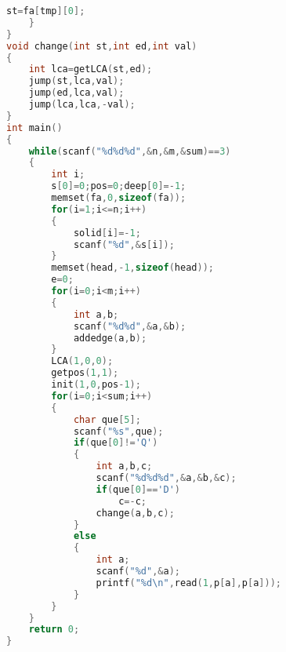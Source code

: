 \begin{lstlisting}[language=c++]
		st=fa[tmp][0];
	}
}
void change(int st,int ed,int val)
{
	int lca=getLCA(st,ed);
	jump(st,lca,val);
	jump(ed,lca,val);
	jump(lca,lca,-val);
}
int main()
{
	while(scanf("%d%d%d",&n,&m,&sum)==3)
	{
		int i;
		s[0]=0;pos=0;deep[0]=-1;
		memset(fa,0,sizeof(fa));
		for(i=1;i<=n;i++)
		{
			solid[i]=-1;
			scanf("%d",&s[i]);
		}
		memset(head,-1,sizeof(head));
		e=0;
		for(i=0;i<m;i++)
		{
			int a,b;
			scanf("%d%d",&a,&b);
			addedge(a,b);
		}
		LCA(1,0,0);
		getpos(1,1);
		init(1,0,pos-1);
		for(i=0;i<sum;i++)
		{
			char que[5];
			scanf("%s",que);
			if(que[0]!='Q')
			{
				int a,b,c;
				scanf("%d%d%d",&a,&b,&c);
				if(que[0]=='D')
					c=-c;
				change(a,b,c);
			}
			else
			{
				int a;
				scanf("%d",&a);
				printf("%d\n",read(1,p[a],p[a]));
			}
		}
	}
	return 0;
}
	\end{lstlisting}